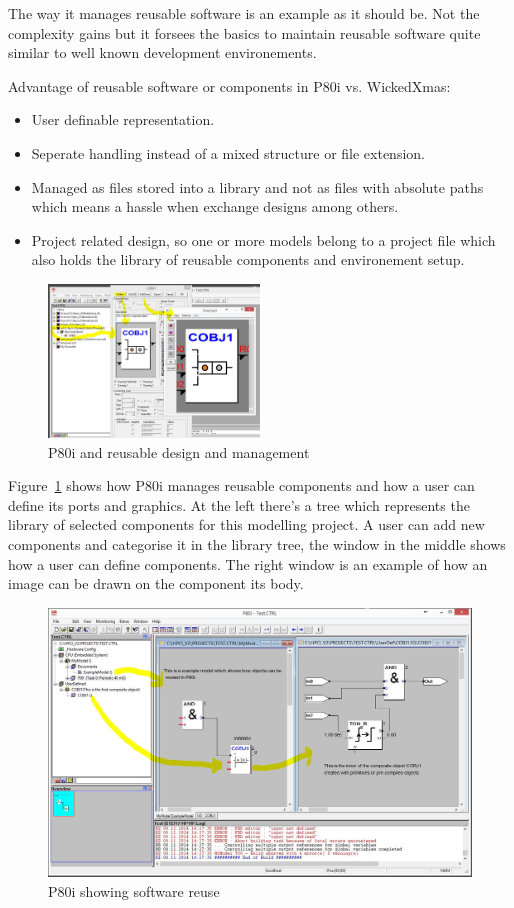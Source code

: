 \documentclass[a4paper,11pt,final]{article}
\begin{document}
The way it manages reusable software is an example as it should be.
Not the complexity gains but it forsees the basics to maintain reusable
software quite similar to well known development environements. 

Advantage of reusable software or components in P80i vs. WickedXmas:
\begin{itemize}
\item User definable representation.
\item Seperate handling instead of a mixed structure or file extension.
\item Managed as files stored into a library and not as files with absolute
paths which means a hassle when exchange designs among others.
\item Project related design, so one or more models belong to a project file
which also holds the library of reusable components and environement setup.
\end{itemize}


\begin{figure}[here]
\center
\includegraphics[width=0.50\textwidth]{p80iObjEditor}
\caption{P80i and reusable design and management}
\label{fig:p80iObjEditor}
\end{figure}
Figure~\ref{fig:p80iObjEditor} shows how P80i manages reusable components
and how a user can define its ports and graphics.
At the left there's a tree which represents the library of selected
components for this modelling project.
A user can add new components and categorise it in the library tree, the window
in the middle shows how a user can define components. The right window
is an example of how an image can be drawn on the component its body.

\begin{figure}[here]
\includegraphics[width=1.0\textwidth]{p80i}
\caption{P80i showing software reuse}
\label{fig:p80i}
\end{figure}
\end{document}
